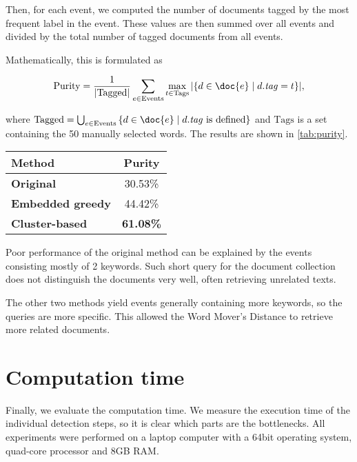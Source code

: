 Then, for each event, we computed the number of documents tagged by the most frequent label in the event. These values are then summed over all events and divided by the total number of tagged documents from all events.

Mathematically, this is formulated as

\begin{equation}
	\text{Purity} = \frac{1}{\left| \text{Tagged} \right|} \sum_{e \in \text{Events}}{\max_{t \in \text{Tags}} {\left| \{ d \in \doc{e} \mid d.\mathit{tag} = t \} \right|} },
\end{equation}

where $\text{Tagged} = \bigcup_{e \in \text{Events}}{\{ d \in \doc{e} \mid d.\mathit{tag} \text{ is defined} \}}$ and $\text{Tags}$ is a set containing the 50 manually selected words. The results are shown in \autoref{tab:purity}.

\hspace{\fill}

\begin{minipage}{\linewidth}
\centering
\begin{tabular}{ l c }\toprule[1.5pt]
\bf Method 	 & \bf Purity \\ \midrule
\bf Original &  30.53\% \\
\bf Embedded greedy   &  44.42\% \\
\bf Cluster-based &  \bf 61.08\% \\ \bottomrule[1.25pt]
\end {tabular}\par
{} \label{tab:purity} 
\end{minipage}

\hspace{\fill}

Poor performance of the original method can be explained by the events consisting mostly of 2 keywords. Such short query for the document collection does not distinguish the documents very well, often retrieving unrelated texts.

The other two methods yield events generally containing more keywords, so the queries are more specific. This allowed the Word Mover's Distance to retrieve more related documents.

\section{Computation time}

Finally, we evaluate the computation time. We measure the execution time of the individual detection steps, so it is clear which parts are the bottlenecks. All experiments were performed on a laptop computer with a 64bit operating system, quad-core processor and 8GB RAM.

